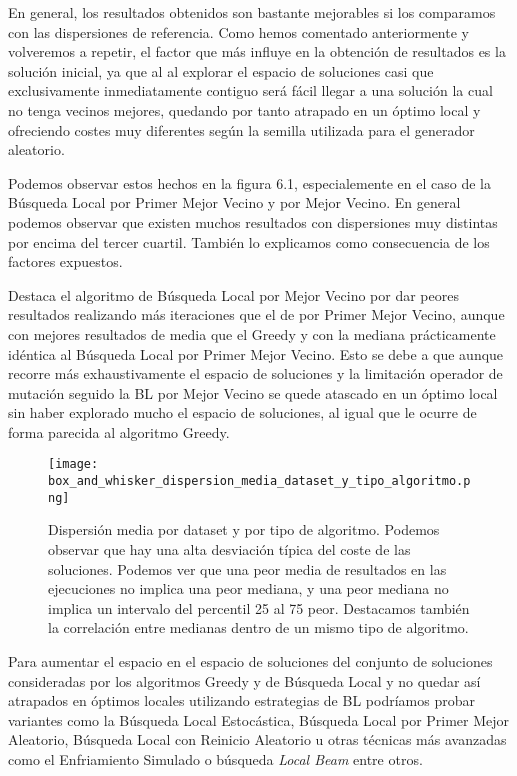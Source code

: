 En general, los resultados obtenidos son bastante mejorables si los comparamos con las dispersiones de referencia. Como hemos
comentado anteriormente y volveremos a repetir, el factor que más influye en la obtención de resultados es la solución inicial,
ya que al al explorar el espacio de soluciones casi que exclusivamente inmediatamente contiguo será fácil llegar a una solución
la cual no tenga vecinos mejores, quedando por tanto atrapado en un óptimo local y ofreciendo costes muy diferentes según la semilla
utilizada para el generador aleatorio.

Podemos observar estos hechos en la figura 6.1, especialemente en el caso de la Búsqueda Local por Primer Mejor Vecino y por Mejor Vecino.
En general podemos observar que existen muchos resultados con dispersiones muy distintas por encima del tercer cuartil. También lo explicamos
como consecuencia de los factores expuestos.

Destaca el algoritmo de Búsqueda Local por Mejor Vecino por dar peores resultados realizando más iteraciones que el de por Primer
Mejor Vecino, aunque con mejores resultados de media que el Greedy y con la mediana prácticamente idéntica al Búsqueda Local por Primer Mejor Vecino.
Esto se debe a que aunque recorre más exhaustivamente el espacio de soluciones y la limitación operador de mutación seguido la BL por Mejor Vecino
se quede atascado en un óptimo local sin haber explorado mucho el espacio de soluciones, al igual que le ocurre de forma parecida al algoritmo Greedy.

\begin{figure}[ht]
    \centering
    \texttt{[image: box\_and\_whisker\_dispersion\_media\_dataset\_y\_tipo\_algoritmo.png]}
    \caption{Dispersión media por dataset y por tipo de algoritmo. Podemos observar que hay una alta desviación típica del coste de las soluciones.
    Podemos ver que una peor media de resultados en las ejecuciones no implica una peor mediana, y una peor mediana no implica un intervalo del percentil 25 al 75 peor.
    Destacamos también la correlación entre medianas dentro de un mismo tipo de algoritmo.}
\end{figure}

Para aumentar el espacio en el espacio de soluciones del conjunto de soluciones consideradas por los algoritmos Greedy y de Búsqueda Local y no quedar
así atrapados en óptimos locales utilizando estrategias de BL podríamos probar variantes como la Búsqueda Local Estocástica, Búsqueda Local por Primer Mejor Aleatorio, Búsqueda Local
con Reinicio Aleatorio u otras técnicas más avanzadas como el Enfriamiento Simulado o búsqueda \textit{Local Beam} entre otros.\cite[Sección 4.1]{russell2020artificial}

